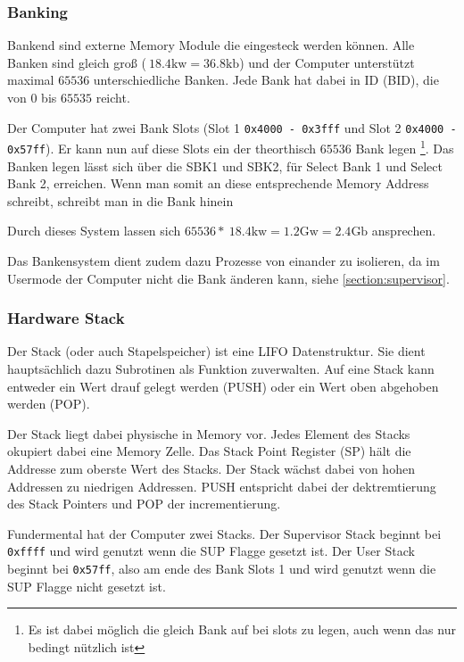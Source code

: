 \documentclass{scrartcl}
\begin{document}
\subsubsection{\label{section:banking}Banking}

Bankend sind externe Memory Module die eingesteck werden können. Alle Banken sind gleich groß ($~18.4\text{kw} = 36.8\text{kb}$) und der Computer unterstützt maximal $65536$ unterschiedliche Banken. Jede Bank hat dabei in ID (BID), die von $0$ bis $65535$ reicht.

Der Computer hat zwei Bank Slots (Slot 1 \texttt{0x4000 - 0x3fff} und Slot 2 \texttt{0x4000 - 0x57ff}). Er kann nun auf diese Slots ein der theorthisch $65536$ Bank legen
\footnote{Es ist dabei möglich die gleich Bank auf bei slots zu legen, auch wenn das nur bedingt nützlich ist}. Das Banken legen lässt sich über die SBK1 und SBK2, für Select Bank 1 und Select Bank 2, erreichen.
Wenn man somit an diese entsprechende Memory Address schreibt, schreibt man in die Bank hinein

Durch dieses System lassen sich $65536 * ~18.4\text{kw} = 1.2\text{Gw} = 2.4\text{Gb}$ ansprechen.

Das Bankensystem dient zudem dazu Prozesse von einander zu isolieren, da im Usermode der Computer nicht die Bank änderen kann, siehe \autoref{section:supervisor}.

\subsubsection{\label{section:stack}Hardware Stack}

Der Stack (oder auch Stapelspeicher) ist eine LIFO Datenstruktur. Sie dient hauptsächlich dazu Subrotinen als Funktion zuverwalten. Auf eine Stack kann entweder ein Wert drauf gelegt werden (PUSH) oder ein Wert oben abgehoben werden (POP). 

Der Stack liegt dabei physische in Memory vor. Jedes Element des Stacks okupiert dabei eine Memory Zelle. Das Stack Point Register (SP) hält die Addresse zum oberste Wert des Stacks. Der Stack wächst dabei von hohen Addressen zu niedrigen Addressen. PUSH entspricht dabei der dektremtierung des Stack Pointers und POP der incrementierung.

Fundermental hat der Computer zwei Stacks. Der Supervisor Stack beginnt bei \texttt{0xffff} und wird genutzt wenn die SUP Flagge gesetzt ist. Der User Stack beginnt bei \texttt{0x57ff}, also am ende des Bank Slots 1 und wird genutzt wenn die SUP Flagge nicht gesetzt ist.
\end{document}
